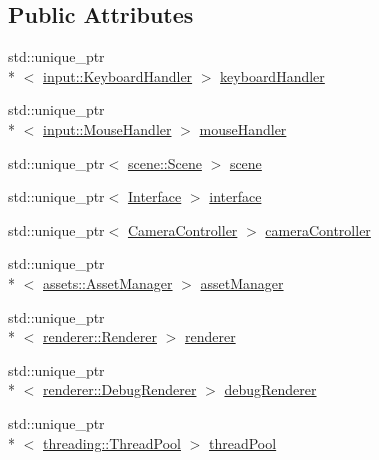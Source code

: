 \subsection*{Public Attributes}
\begin{DoxyCompactItemize}
\item 
std\-::unique\-\_\-ptr\\*
$<$ \hyperlink{classinput_1_1KeyboardHandler}{input\-::\-Keyboard\-Handler} $>$ \hyperlink{classClient_ab3555d9bf11fd111bde33977cba15564}{keyboard\-Handler}
\item 
std\-::unique\-\_\-ptr\\*
$<$ \hyperlink{classinput_1_1MouseHandler}{input\-::\-Mouse\-Handler} $>$ \hyperlink{classClient_af554443b807f1ea3f63970efe51a4b65}{mouse\-Handler}
\item 
std\-::unique\-\_\-ptr$<$ \hyperlink{classscene_1_1Scene}{scene\-::\-Scene} $>$ \hyperlink{classClient_af8d1678588c945262a77bddf81fe432d}{scene}
\item 
std\-::unique\-\_\-ptr$<$ \hyperlink{classInterface}{Interface} $>$ \hyperlink{classClient_af26242132ec324e1d85fec7e1d1e97d3}{interface}
\item 
std\-::unique\-\_\-ptr$<$ \hyperlink{classCameraController}{Camera\-Controller} $>$ \hyperlink{classClient_a31467035f96d4630d6787a500f2dce71}{camera\-Controller}
\item 
std\-::unique\-\_\-ptr\\*
$<$ \hyperlink{classassets_1_1AssetManager}{assets\-::\-Asset\-Manager} $>$ \hyperlink{classClient_ae9bbbe2ace139bf7a3d0ff5358e4c222}{asset\-Manager}
\item 
std\-::unique\-\_\-ptr\\*
$<$ \hyperlink{classrenderer_1_1Renderer}{renderer\-::\-Renderer} $>$ \hyperlink{classClient_a86f232e1c10bf55bb1512814de486c3a}{renderer}
\item 
std\-::unique\-\_\-ptr\\*
$<$ \hyperlink{classrenderer_1_1DebugRenderer}{renderer\-::\-Debug\-Renderer} $>$ \hyperlink{classClient_ab189badcd85ba72158b28028888569d4}{debug\-Renderer}
\item 
std\-::unique\-\_\-ptr\\*
$<$ \hyperlink{classthreading_1_1ThreadPool}{threading\-::\-Thread\-Pool} $>$ \hyperlink{classClient_a91d160a7044d37dd6ae7e74044989352}{thread\-Pool}
\end{DoxyCompactItemize}


